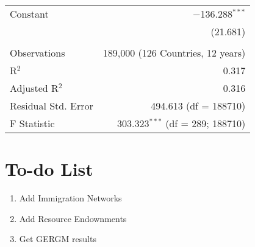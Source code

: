 \documentclass{article}
\begin{document}
\begin{longtable}{lr}
 Constant & $-$136.288$^{***}$ \\ 
  & (21.681) \\ 

\hline \\[-1.8ex] 
Observations & 189,000 (126 Countries, 12 years)\\ 
R$^{2}$ & 0.317 \\ 
Adjusted R$^{2}$ & 0.316 \\ 
Residual Std. Error & 494.613 (df = 188710) \\ 
F Statistic & 303.323$^{***}$ (df = 289; 188710) \\ 
\end{longtable} 

\section{To-do List}
\begin{enumerate}
	\item Add Immigration Networks
	\item Add Resource Endownments
	\item Get GERGM results	
\end{enumerate}
\end{document}
